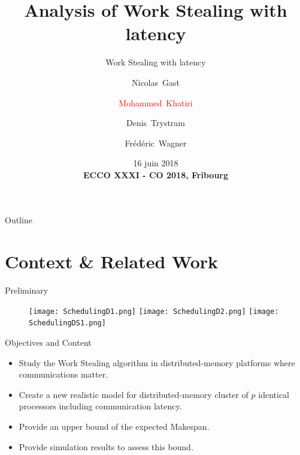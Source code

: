 \documentclass{beamer}
\title{Analysis of Work Stealing with latency}
\subtitle{Work Stealing with latency}
\author{Nicolas~Gast\inst{1} \and \textcolor{red}{Mohammed~Khatiri}\inst{1}\inst{2} \and Denis~Trystram\inst{1} \and Fr\'ed\'eric~Wagner\inst{1}}
\institute[Univ. Grenoble Alpes, CNRS, Inria, LIG] %
{
    \inst{1}%
  Univ. Grenoble Alpes, France
  \and
  \inst{2}%
  University Mohammed First, Morocco}
\date{16 juin 2018 \\ \textbf{ECCO XXXI - CO 2018, Fribourg}}
\begin{document}
\begin{frame}
    \titlepage
\end{frame}

\begin{frame}{Outline}
    \tableofcontents
\end{frame}

\section{Context \& Related Work}

\begin{frame}{Preliminary}
    \begin{figure}
    \begin{center}
    \end{center}
    \end{figure}

       \begin{center}
        \end{center}
    \begin{figure}
    \begin{center}
         {\texttt{[image: SchedulingD1.png]}}
         {\texttt{[image: SchedulingD2.png]}}
         {\texttt{[image: SchedulingDS1.png]}}
    \end{center}
    \end{figure}


\end{frame}


\begin{frame}{Objectives and Content}
    \begin{itemize}%
        \item {
               Study the Work Stealing algorithm in distributed-memory platforms where communications matter. 
            }
        \item {

               Create a new realistic model for distributed-memory cluster of $p$ identical processors including communication latency. 
            }
        \item {
                Provide an upper bound of the expected Makespan.
            }
        \item {
               Provide simulation results to assess this bound. 
            }
    \end{itemize}
\end{frame}
\end{document}
